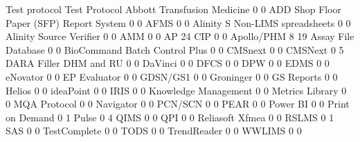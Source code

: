 \documentclass{article}
\begin{document}
\begin{Schunk}
\begin{Soutput}
                                           Test protocol Test Protocol
  Abbott Transfusion Medicine                          0             0
  ADD Shop Floor Paper (SFP) Report System             0             0
  AFMS                                                 0             0
  Alinity S Non-LIMS spreadsheets                      0             0
  Alinity Source Verifier                              0             0
  AMM                                                  0             0
  AP 24 CIP                                            0             0
  Apollo/PHM                                           8            19
  Assay File Database                                  0             0
  BioCommand Batch Control Plus                        0             0
  CMSnext                                              0             0
  CMSNext                                              0             5
  DARA Filler DHM and RU                               0             0
  DaVinci                                              0             0
  DFCS                                                 0             0
  DPW                                                  0             0
  EDMS                                                 0             0
  eNovator                                             0             0
  EP Evaluator                                         0             0
  GDSN/GS1                                             0             0
  Groninger                                            0             0
  GS Reports                                           0             0
  Helios                                               0             0
  ideaPoint                                            0             0
  IRIS                                                 0             0
  Knowledge Management                                 0             0
  Metrics Library                                      0             0
  MQA Protocol                                         0             0
  Navigator                                            0             0
  PCN/SCN                                              0             0
  PEAR                                                 0             0
  Power BI                                             0             0
  Print on Demand                                      0             1
  Pulse                                                0             4
  QIMS                                                 0             0
  QPI                                                  0             0
  Reliasoft Xfmea                                      0             0
  RSLMS                                                0             1
  SAS                                                  0             0
  TestComplete                                         0             0
  TODS                                                 0             0
  TrendReader                                          0             0
  WWLIMS                                               0             0
                                          

\end{Soutput}
\end{Schunk}
\end{document}
